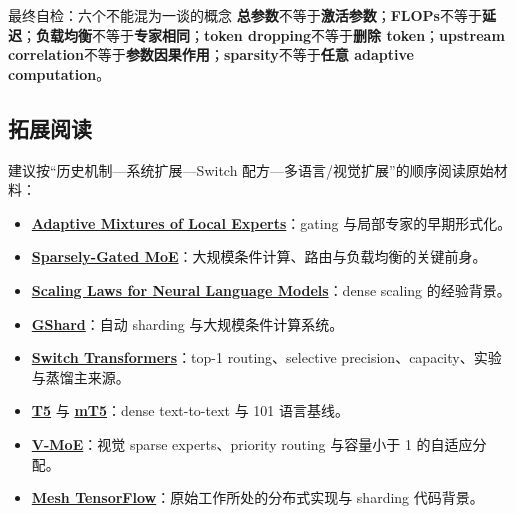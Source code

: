 \begin{warningbox}{最终自检：六个不能混为一谈的概念}
\textbf{总参数}不等于\textbf{激活参数}；\textbf{FLOPs}不等于\textbf{延迟}；\textbf{负载均衡}不等于\textbf{专家相同}；\textbf{token dropping}不等于\textbf{删除 token}；\textbf{upstream correlation}不等于\textbf{参数因果作用}；\textbf{sparsity}不等于\textbf{任意 adaptive computation}。
\end{warningbox}

\subsection{拓展阅读}

建议按“历史机制—系统扩展—Switch 配方—多语言/视觉扩展”的顺序阅读原始材料：

{\small
\begin{itemize}[nosep,leftmargin=*]
  \item \href{https://doi.org/10.1162/neco.1991.3.1.79}{\textbf{Adaptive Mixtures of Local Experts}}：gating 与局部专家的早期形式化。
  \item \href{https://arxiv.org/abs/1701.06538}{\textbf{Sparsely-Gated MoE}}：大规模条件计算、路由与负载均衡的关键前身。
  \item \href{https://arxiv.org/abs/2001.08361}{\textbf{Scaling Laws for Neural Language Models}}：dense scaling 的经验背景。
  \item \href{https://arxiv.org/abs/2006.16668}{\textbf{GShard}}：自动 sharding 与大规模条件计算系统。
  \item \href{https://arxiv.org/abs/2101.03961}{\textbf{Switch Transformers}}：top-1 routing、selective precision、capacity、实验与蒸馏主来源。
  \item \href{https://arxiv.org/abs/1910.10683}{\textbf{T5}} 与 \href{https://arxiv.org/abs/2010.11934}{\textbf{mT5}}：dense text-to-text 与 101 语言基线。
  \item \href{https://arxiv.org/abs/2106.05974}{\textbf{V-MoE}}：视觉 sparse experts、priority routing 与容量小于 1 的自适应分配。
  \item \href{https://github.com/tensorflow/mesh}{\textbf{Mesh TensorFlow}}：原始工作所处的分布式实现与 sharding 代码背景。
\end{itemize}
}


